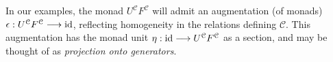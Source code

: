 \documentclass[11pt]{amsart}
\theoremstyle{plain}
\theoremstyle{definition}
\renewcommand{\to}{\longrightarrow}
\newcommand{\calU}{\mathcal{U}}
\newcommand{\calL}{\mathcal{L}}
\newcommand{\calV}{\mathcal{V}}
\newcommand{\calw}{\mathcal{W}}
\newcommand{\calc}{\mathcal{C}}
\theoremstyle{plain}
\newcommand{\vect}[2]{\calV^{#1}_{#2}}
\newcommand{\F}{\mathbb{F}}
\newcommand{\Id}{\textup{id}}
\newcommand{\Ftwo}{\F_2}
\begin{document}
\begin{Conventions and notation}
%
%
%
%

In our examples, the monad $U^{\calc}F^{\calc}$ will admit an augmentation (of monads) $\epsilon:U^{\calc}F^{\calc}\to\Id$, reflecting homogeneity in the relations defining $\calc$. This augmentation has the monad unit $\eta:\Id\to U^{\calc}F^{\calc}$ as a section, and may be thought of as \emph{projection onto generators}.



\end{Conventions and notation}
\end{document}
